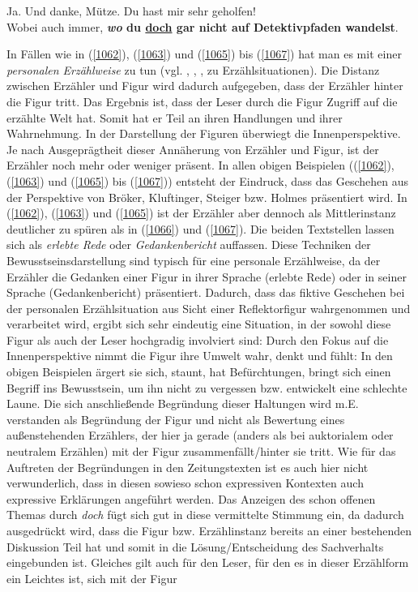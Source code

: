 {\begin{exe}
	\ex\label{1069} 
	\scriptsize
	\glqq Ja. Und danke, Mütze. Du hast mir sehr geholfen! \grqq{}\\
	\glqq Wobei auch immer, \textbf{\textit{wo} du \underline{doch} gar nicht auf Detektivpfaden wandelst}.\grqq{}
	\hfill\hbox {\citet[56]{Glauche2014}}
\end{exe}
In Fällen wie in (\ref{1062}), (\ref{1063}) und (\ref{1065}) bis (\ref{1067}) hat man es mit einer \textit{personalen Erzählweise}  zu tun (vgl. \citealt[89-102]{Eicher2001}, \citealt[264-283]{Spoerl2004}, \citealt[49-50]{Klarer2009}, \citealt[114-119]{Nuenning2015} zu Erzählsi\-tuationen). Die Distanz zwischen Erzähler und Figur wird dadurch aufgegeben, dass der Erzähler hinter die Figur tritt. Das Ergebnis ist, dass der Leser durch die Figur Zugriff auf die erzählte Welt hat. Somit hat er Teil an ihren Handlungen und ihrer Wahrnehmung. In der Darstellung der Figuren überwiegt die Innen\-perspektive. Je nach Ausgeprägtheit dieser Annäherung von Erzähler und Figur, ist der Erzähler noch mehr oder weniger präsent. In allen obigen Beispielen ((\ref{1062}), (\ref{1063}) und (\ref{1065}) bis (\ref{1067})) entsteht der Eindruck, dass das \glq Geschehen\grq {} aus der Perspektive von Bröker, Kluftinger, Steiger bzw. Holmes präsentiert wird. In (\ref{1062}), (\ref{1063}) und (\ref{1065}) ist der Erzähler aber dennoch als Mittlerinstanz deutlicher zu spüren als in (\ref{1066}) und (\ref{1067}). Die beiden Textstellen lassen sich als \textit{erlebte Rede}  oder \textit{Gedankenbericht}   auffassen. Diese Techniken der Bewusstseinsdarstellung sind typisch für eine personale Erzählweise, da der Erzähler die Gedanken einer Figur in ihrer Sprache (erlebte Rede) oder in seiner Sprache (Gedankenbericht) präsentiert. Dadurch, dass das fiktive Geschehen bei der personalen Erzählsituation aus Sicht einer Reflektorfigur  wahrgenommen und verarbeitet wird, ergibt sich sehr eindeutig eine Situation, in der sowohl diese Figur als auch der Leser hochgradig involviert sind: Durch den Fokus auf die Innenperspektive nimmt die Figur ihre Umwelt wahr, denkt und fühlt: In den obigen Beispielen ärgert sie sich, staunt, hat Befürchtungen, bringt sich einen Begriff ins Bewusstsein, um ihn nicht zu vergessen bzw. entwickelt eine schlechte Laune. Die sich anschließende Begründung dieser Haltungen wird m.E. verstanden als Begründung der Figur und nicht als Bewertung eines außenstehenden Erzählers, der hier ja gerade (anders als bei auktorialem  oder  neutralem Erzählen) mit der Figur zusammenfällt/hinter sie tritt. Wie für das Auftreten der Begründungen in den Zeitungstexten ist es auch hier nicht verwunderlich, dass in diesen sowieso schon expressiven Kontexten auch expressive Erklärungen angeführt werden. Das Anzeigen des schon offenen Themas durch \textit{doch} fügt sich gut in diese vermittelte Stimmung ein, da dadurch ausgedrückt wird, dass die Figur bzw. Erzählinstanz bereits an einer bestehenden Diskussion Teil hat und somit in die Lösung/Entscheidung des Sachverhalts eingebunden ist. Gleiches gilt auch für den Leser, für den es in dieser Erzählform ein Leichtes ist, sich mit der Figur }
